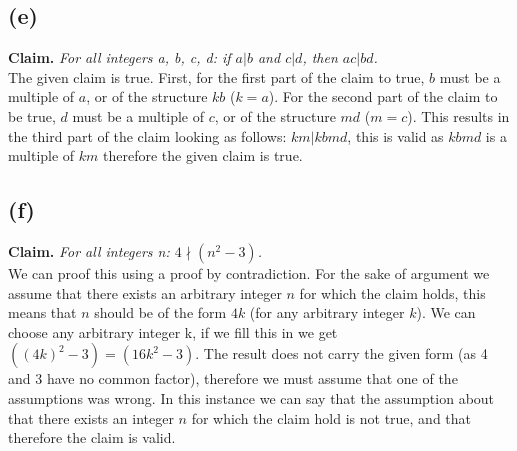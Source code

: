 \documentclass[a4paper]{article}
\begin{document}
\subsection{(e)} 
\textbf{Claim.} \textit{For all integers a, b, c, d: if $a|b$ and $c|d$, then $ac | bd$.} \\
The given claim is true.
First, for the first part of the claim to true, $b$ must be a multiple of $a$, or of the structure $kb$ ($k = a$).
For the second part of the claim to be true, $d$ must be a multiple of $c$, or of the structure $md$ ($m = c$).
This results in the third part of the claim looking as follows: $km | kbmd$, this is valid as $kbmd$ is a multiple of $km$ therefore the given claim is true.
\subsection{(f)} 
\textbf{Claim.} \textit{For all integers n: $4 \nmid (n^2 - 3)$.} \\
We can proof this using a proof by contradiction.
For the sake of argument we assume that there exists an arbitrary integer $n$ for which the claim holds, this means that $n$ should be of the form $4k$ (for any arbitrary integer $k$).
We can choose any arbitrary integer k, if we fill this in we get $((4k)^2 - 3) = (16k^2 - 3)$.
The result does not carry the given form (as 4 and 3 have no common factor), therefore we must assume that one of the assumptions was wrong.
In this instance we can say that the assumption about that there exists an integer $n$ for which the claim hold is not true, and that therefore the claim is valid.
\end{document}
